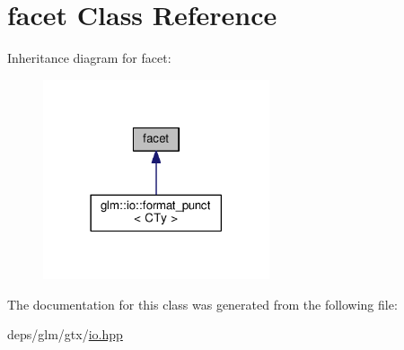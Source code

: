 \hypertarget{classstd_1_1locale_1_1facet}{}\section{facet Class Reference}
\label{classstd_1_1locale_1_1facet}


Inheritance diagram for facet\+:
\nopagebreak
\begin{figure}[H]
\begin{center}
\leavevmode
\includegraphics[width=189pt]{d5/d97/classstd_1_1locale_1_1facet__inherit__graph}
\end{center}
\end{figure}


The documentation for this class was generated from the following file\+:\begin{DoxyCompactItemize}
\item 
deps/glm/gtx/\hyperlink{io_8hpp}{io.\+hpp}\end{DoxyCompactItemize}
